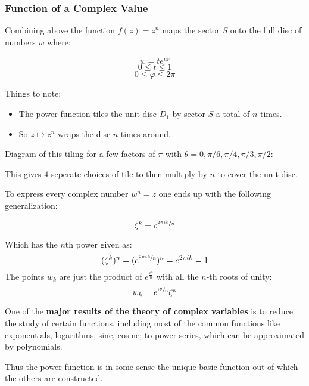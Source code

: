 \subsubsection*{Function of a Complex Value}
Combining above the function $f(z) = z^n$ maps the sector $S$ onto the full disc of numbers $w$ where:

\[w = te^{i\varphi} \]
\[0 \leq t \leq 1\]
\[0 \leq \varphi \leq 2\pi \]

Things to note:
\begin{itemize}
	\item The power function tiles the unit disc $D_1$ by sector $S$ a total of $n$ times. 
	\item So $z \mapsto z^n$ wraps the disc $n$ times around.
\end{itemize}

Diagram of this tiling for a few factors of $\pi$ with $\theta = 0, \pi/6, \pi/4, \pi/3, \pi/2$:


This gives $4$ seperate choices of tile to then multiply by $n$ to cover the unit disc.

To express every complex number $w^n = z$ one ends up with the following generalization:
\begin{defn}
	\[\zeta^k = e^{\sfrac{2\pi ik}{n}}\]
\end{defn}
Which has the $n$th power given as:
\[ (\zeta^k)^n = ( e^{\sfrac{2\pi ik}{n}} )^n = e^{2\pi ik} = 1 \]
The points $w_k$ are just the product of $e^{\frac{i\theta}{n}}$ with all the $n$-th roots of unity:
\[w_k = e^{\sfrac{i\theta}{n}}\zeta^k\]

One of the \textbf{major results of the theory of complex variables} is to reduce the study of certain functions, including most of the 
common functions like exponentials, logarithms, sine, cosine; to power series, which can be approximated by polynomials.

Thus the power function is in some sense the unique basic function out of which the others are constructed.
\newpage
